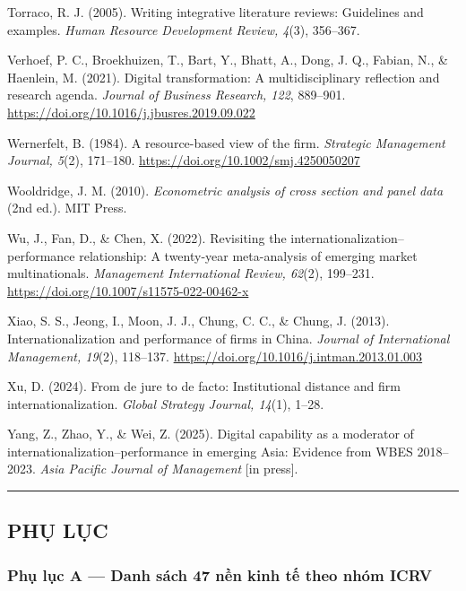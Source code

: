 \documentclass[12pt,a4paper]{article}
\begin{document}
Torraco, R. J. (2005). Writing integrative literature reviews:
Guidelines and examples. \emph{Human Resource Development Review, 4}(3),
356--367.

Verhoef, P. C., Broekhuizen, T., Bart, Y., Bhatt, A., Dong, J. Q.,
Fabian, N., \& Haenlein, M. (2021). Digital transformation: A
multidisciplinary reflection and research agenda. \emph{Journal of
Business Research, 122}, 889--901.
\url{https://doi.org/10.1016/j.jbusres.2019.09.022}

Wernerfelt, B. (1984). A resource-based view of the firm.
\emph{Strategic Management Journal, 5}(2), 171--180.
\url{https://doi.org/10.1002/smj.4250050207}

Wooldridge, J. M. (2010). \emph{Econometric analysis of cross section
and panel data} (2nd ed.). MIT Press.

Wu, J., Fan, D., \& Chen, X. (2022). Revisiting the
internationalization--performance relationship: A twenty-year
meta-analysis of emerging market multinationals. \emph{Management
International Review, 62}(2), 199--231.
\url{https://doi.org/10.1007/s11575-022-00462-x}

Xiao, S. S., Jeong, I., Moon, J. J., Chung, C. C., \& Chung, J. (2013).
Internationalization and performance of firms in China. \emph{Journal of
International Management, 19}(2), 118--137.
\url{https://doi.org/10.1016/j.intman.2013.01.003}

Xu, D. (2024). From de jure to de facto: Institutional distance and firm
internationalization. \emph{Global Strategy Journal, 14}(1), 1--28.

Yang, Z., Zhao, Y., \& Wei, Z. (2025). Digital capability as a moderator
of internationalization--performance in emerging Asia: Evidence from
WBES 2018--2023. \emph{Asia Pacific Journal of Management} {[}in
press{]}.

\begin{center}\rule{0.5\linewidth}{0.5pt}\end{center}

\hypertarget{phux1ee5-lux1ee5c}{%
\subsection{PHỤ LỤC}\label{phux1ee5-lux1ee5c}}

\hypertarget{phux1ee5-lux1ee5c-a--danh-suxe1ch-47-nux1ec1n-kinh-tux1ebf-theo-nhuxf3m-icrv}{%
\subsubsection{Phụ lục A --- Danh sách 47 nền kinh tế theo nhóm
ICRV}\label{phux1ee5-lux1ee5c-a--danh-suxe1ch-47-nux1ec1n-kinh-tux1ebf-theo-nhuxf3m-icrv}}
\end{document}
